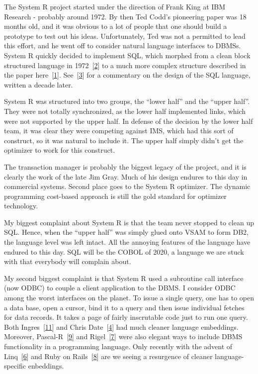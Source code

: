 \documentclass[b5paper,11pt,twoside,openright]{book}
\begin{document}
The System R project started under the direction of Frank King at IBM
Research - probably around 1972. By then Ted Codd's pioneering paper was
18 months old, and it was obvious to a lot of people that one should
build a prototype to test out his ideas. Unfortunately, Ted was not a
permitted to lead this effort, and he went off to consider natural
language interfaces to DBMSs. System R quickly decided to implement SQL,
which morphed from a clean block structured language in
1972~{{[}\protect\hyperlink{ref-chamberlin-sequel}{2}{]}} to a much more
complex structure described in the paper
here~{{[}\protect\hyperlink{ref-chamberlin-history}{1}{]}}.
See~{{[}\protect\hyperlink{ref-date}{3}{]}} for a commentary on the
design of the SQL language, written a decade later.

System R was structured into two groups, the ``lower half'' and the
``upper half''. They were not totally synchronized, as the lower half
implemented links, which were not supported by the upper half. In
defense of the decision by the lower half team, it was clear they were
competing against IMS, which had this sort of construct, so it was
natural to include it. The upper half simply didn't get the optimizer to
work for this construct.

The transaction manager is probably the biggest legacy of the project,
and it is clearly the work of the late Jim Gray. Much of his design
endures to this day in commercial systems. Second place goes to the
System R optimizer. The dynamic programming cost-based approach is still
the gold standard for optimizer technology.

My biggest complaint about System R is that the team never stopped to
clean up SQL. Hence, when the ``upper half'' was simply glued onto VSAM
to form DB2, the language level was left intact. All the annoying
features of the language have endured to this day. SQL will be the COBOL
of 2020, a language we are stuck with that everybody will complain
about.

My second biggest complaint is that System R used a subroutine call
interface (now ODBC) to couple a client application to the DBMS. I
consider ODBC among the worst interfaces on the planet. To issue a
single query, one has to open a data base, open a cursor, bind it to a
query and then issue individual fetches for data records. It takes a
page of fairly inscrutable code just to run one query. Both
Ingres~{{[}\protect\hyperlink{ref-ingres}{11}{]}} and Chris
Date~{{[}\protect\hyperlink{ref-date-language}{4}{]}} had much cleaner
language embeddings. Moreover,
Pascal-R~{{[}\protect\hyperlink{ref-pascalr}{9}{]}} and
Rigel~{{[}\protect\hyperlink{ref-rigel}{7}{]}} were also elegant ways to
include DBMS functionality in a programming language. Only recently with
the advent of Linq~{{[}\protect\hyperlink{ref-linq}{6}{]}} and Ruby on
Rails~{{[}\protect\hyperlink{ref-rails}{8}{]}} are we seeing a
resurgence of cleaner language-specific enbeddings.
\end{document}
